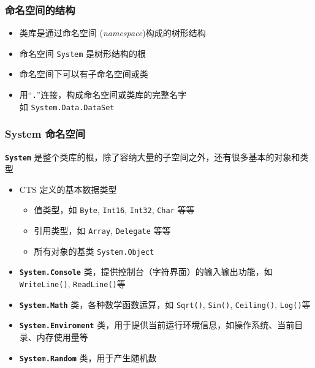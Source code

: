 \begin{frame}
\frametitle{命名空间的结构}

\begin{itemize}
\item 类库是通过{命名空间} (\textit{namespace})构成的树形结构
\item 命名空间 \texttt{System} 是树形结构的根
\item 命名空间下可以有{\color<handout:0>{red!60!black}子命名空间}或{类}
\item 用``\textbf{\texttt{.}}''连接，构成命名空间或类库的完整名字 \\ 如 \texttt{System.Data.DataSet}
\end{itemize}

\begin{onlyenv}
  \begin{figure}[h] \label<1| handout:1>{fig:fcl-namespaces} \centering
    
  \end{figure}
\end{onlyenv}
\end{frame}

\begin{frame}
\frametitle{System 命名空间}

\CJKindent \texttt{\textbf{System}} 是整个类库的根，除了容纳大量的子空间之外，还有很多基本的对象和类型
\begin{itemize}
\item CTS 定义的基本数据类型
  \begin{itemize}
  \item 值类型，如 \texttt{Byte}, \texttt{Int16}, \texttt{Int32}, \texttt{Char} 等等
  \item 引用类型，如 \texttt{Array}, \texttt{Delegate} 等等
  \item 所有对象的基类 \texttt{System.Object}
  \end{itemize}
\item \texttt{\textbf{System.Console}} 类，提供控制台（字符界面）的输入输出功能，如 \texttt{WriteLine()},
  \texttt{ReadLine()}等
\item \texttt{\textbf{System.Math}} 类，各种数学函数运算，如 \texttt{Sqrt()}, \texttt{Sin()}, \texttt{Ceiling()}, \texttt{Log()}等
\item \texttt{\textbf{System.Enviroment}} 类，用于提供当前运行环境信息，如操作系统、当前目录、内存使用量等
\item \texttt{\textbf{System.Random}} 类，用于产生随机数

\end{itemize}

\end{frame}

